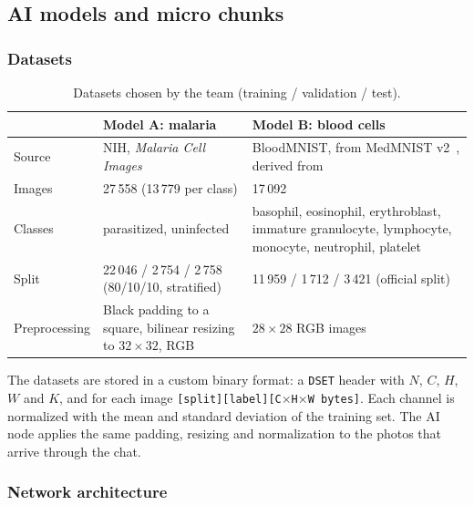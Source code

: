 \documentclass[10pt,a4paper]{article}
\begin{document}
\subsection{AI models and micro chunks}

\subsubsection{Datasets}

\begin{table}[H]
\centering
\small
\begin{tabularx}{\textwidth}{p{3cm}YY}
\toprule
 & \textbf{Model A: malaria} & \textbf{Model B: blood cells} \\
\midrule
Source & NIH, \textit{Malaria Cell Images}~\cite{malaria} & BloodMNIST, from MedMNIST v2~\cite{medmnist}, derived from~\cite{acevedo} \\
Images & 27\,558 (13\,779 per class) & 17\,092 \\
Classes & parasitized, uninfected & basophil, eosinophil, erythroblast, immature granulocyte, lymphocyte, monocyte, neutrophil, platelet \\
Split & 22\,046 / 2\,754 / 2\,758 (80/10/10, stratified) & 11\,959 / 1\,712 / 3\,421 (official split) \\
Preprocessing & Black padding to a square, bilinear resizing to $32 \times 32$, RGB & $28 \times 28$ RGB images \\
\bottomrule
\end{tabularx}
\caption{Datasets chosen by the team (training / validation / test).}
\label{tab:datasets}
\end{table}

The datasets are stored in a custom binary format: a \texttt{DSET} header with $N$, $C$, $H$, $W$ and
$K$, and for each image \texttt{[split][label][C$\times$H$\times$W bytes]}. Each channel is normalized
with the mean and standard deviation of the training set. The AI node applies the same padding,
resizing and normalization to the photos that arrive through the chat.

\subsubsection{Network architecture}
\end{document}

